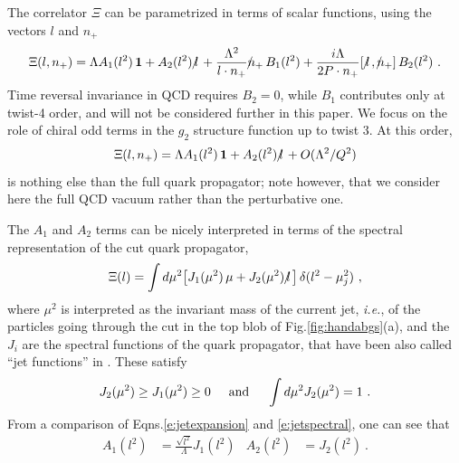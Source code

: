 \documentclass[preprintnumbers,floatfix,nofootinbib]{revtex4}
\newcommand{\lslash}{l \hspace{-0.19cm} / \,}
\newcommand{\nslash}{n \hspace{-0.24cm} / \,}
\begin{document}
The correlator $\Xi$ can be parametrized in terms of scalar functions, using the vectors $l$ and $n_+$ 
\begin{equation}
\Xi(l,n_+) = \Lambda A_1(l^2)\,{\bm 1} + A_2(l^2)\,\lslash 
+ \frac{\Lambda^2}{l \cdot n_{+}} \nslash_+ \, B_{1}(l^2)
+ \frac{i \Lambda}{2 P \cdot n_{+}} [\,\lslash,\nslash_+ ] \, B_{2}(l^2) \ .
\label{e:jetexpansion}
\end{equation} 
Time reversal invariance in QCD requires $B_{2}=0$, while $B_{1}$ contributes
only at twist-4 order, and will not be considered further in this paper. We
focus on the role of chiral odd terms in the $g_2$ structure function up to
twist 3.  At this order, 
\begin{equation}
  \Xi(l,n_+) = \Lambda A_1(l^2)\,{\bm 1} + A_2(l^2)\,\lslash 
    + O(\Lambda^2/Q^2)
\label{e:jetexpansion-tw3}
\end{equation} 
is nothing else than the full quark propagator; note however, that we consider
here the full QCD vacuum rather than the perturbative one.  

The $A_1$ and $A_2$ terms can be nicely interpreted in terms of the spectral representation of the cut quark propagator,
\begin{align} 
  \Xi(l) =  
  \int d \mu^2 \big[ J_1 (\mu^2)\,\mu + J_2 (\mu^2)\,\lslash \big] \,
  \delta(l^2 -\mu_j^2) \ ,
\label{e:jetspectral}
\end{align}
where $\mu^2$ is interpreted as the invariant mass of the current jet, {\it i.e.}, of the particles going through the cut in the top blob of Fig.\ref{fig:handabgs}(a), and the $J_i$ are the spectral functions of the quark propagator, that have been also called ``jet functions'' in \cite{Accardi-Qiu}. These satisfy \cite{D'Hoker-lecture-notes,Romao-lecture-notes}
\begin{align}
  J_2(\mu^2) \geq J_1(\mu^2) \geq 0
  \hspace*{0.5cm} \text{and} \hspace*{0.5cm}
  \int d\mu^2 J_2(\mu^2) = 1 \ .
\label{eq:jetfnsprops}
\end{align}
From a comparison of Eqns.\eqref{e:jetexpansion} and \eqref{e:jetspectral}, one can see that 
\begin{align}
  A_1(l^2)&=\frac{\sqrt{l^2}}{\Lambda}J_1(l^2) & A_2(l^2)&=J_2(l^2) \ .
  \label{eq:jet_vs_spectral}
\end{align}
\end{document}
